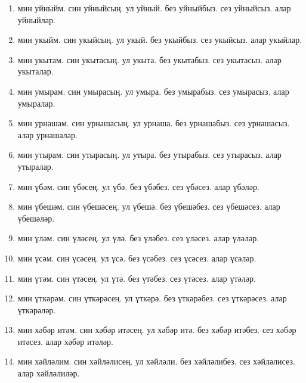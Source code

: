\documentclass{article}
\begin{document}
\begin{enumerate}
    \item
    мин уйныйм.
    син уйныйсың.
    ул уйный.
    без уйныйбыз.
    сез уйныйсыз.
    алар уйныйлар.

    \item
    мин укыйм.
    син укыйсың.
    ул укый.
    без укыйбыз.
    сез укыйсыз.
    алар укыйлар.

    \item
    мин укытам.
    син укытасың.
    ул укыта.
    без укытабыз.
    сез укытасыз.
    алар укыталар.

    \item
    мин умырам.
    син умырасың.
    ул умыра.
    без умырабыз.
    сез умырасыз.
    алар умыралар.

    \item
    мин урнашам.
    син урнашасың.
    ул урнаша.
    без урнашабыз.
    сез урнашасыз.
    алар урнашалар.

    \item
    мин утырам.
    син утырасың.
    ул утыра.
    без утырабыз.
    сез утырасыз.
    алар утыралар.

    \item
    мин үбәм.
    син үбәсең.
    ул үбә.
    без үбәбез.
    сез үбәсез.
    алар үбәләр.

    \item
    мин үбешәм.
    син үбешәсең.
    ул үбешә.
    без үбешәбез.
    сез үбешәсез.
    алар үбешәләр.

    \item
    мин үләм.
    син үләсең.
    ул үлә.
    без үләбез.
    сез үләсез.
    алар үләләр.

    \item
    мин үсәм.
    син үсәсең.
    ул үсә.
    без үсәбез.
    сез үсәсез.
    алар үсәләр.

    \item
    мин үтәм.
    син үтәсең.
    ул үтә.
    без үтәбез.
    сез үтәсез.
    алар үтәләр.

    \item
    мин үткәрәм.
    син үткәрәсең.
    ул үткәрә.
    без үткәрәбез.
    сез үткәрәсез.
    алар үткәрәләр.

    \item
    мин хәбәр итәм.
    син хәбәр итәсең.
    ул хәбәр итә.
    без хәбәр итәбез.
    сез хәбәр итәсез.
    алар хәбәр итәләр.

    \item
    мин хәйләлим.
    син хәйләлисең.
    ул хәйләли.
    без хәйләлибез.
    сез хәйләлисез.
    алар хәйләлиләр.


\end{enumerate}
\end{document}
